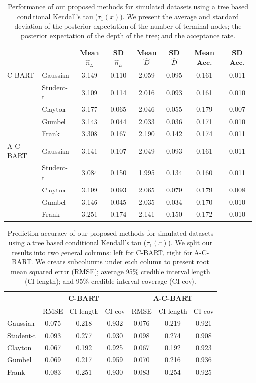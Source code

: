 \documentclass[
12pt]{article}
\begin{document}
	\begin{table}[h]
		\centering
		\begin{tabular}{l|l|cccccc}
			& & Mean $\hat{n}_L$ & SD $\hat{n}_L$ & Mean $\hat{D}$ & SD $\hat{D}$ & Mean Acc. & SD Acc. \\ 
			\hline
			C-BART & Gaussian & 3.149 & 0.110 & 2.059 & 0.095 & 0.161 & 0.011 \\ 
			& Student-t & 3.109 & 0.114 & 2.016 & 0.093 & 0.161 & 0.010 \\ 
			& Clayton & 3.177 & 0.065 & 2.046 & 0.055 & 0.179 & 0.007 \\ 
			& Gumbel & 3.143 & 0.044 & 2.033 & 0.036 & 0.171 & 0.010 \\ 
			& Frank & 3.308 & 0.167 & 2.190 & 0.142 & 0.174 & 0.011 \\
			\hline
			A-C-BART & Gaussian & 3.141 & 0.107 & 2.049 & 0.093 & 0.161 & 0.011 \\ 
			& Student-t & 3.084 & 0.150 & 1.995 & 0.134 & 0.160 & 0.011 \\ 
			& Clayton & 3.199 & 0.093 & 2.065 & 0.079 & 0.179 & 0.008 \\ 
			& Gumbel & 3.146 & 0.045 & 2.035 & 0.034 & 0.170 & 0.010 \\ 
			& Frank & 3.251 & 0.174 & 2.141 & 0.150 & 0.172 & 0.010 \\
		\end{tabular}
		\caption{Performance of our proposed methods for simulated datasets using a tree based conditional Kendall's tau ($\tau_1(x)$). We present the average and standard deviation of the posterior expectation of the number of terminal nodes; the posterior expectation of the depth of the tree; and the acceptance rate.}
		\label{tab:eff:ex1}
	\end{table}
	
	\begin{table}[ht]
		\centering
		\begin{tabular}{l|ccc|ccc}
			\multicolumn{1}{c|}{} &
			\multicolumn{3}{c|}{C-BART} &
			\multicolumn{3}{c}{A-C-BART} \\
			\hline
			& RMSE & CI-length & CI-cov & RMSE & CI-length & CI-cov \\ 
			\hline
			Gaussian & 0.075 & 0.218 & 0.932 & 0.076 & 0.219 & 0.921 \\ 
			Student-t & 0.093 & 0.277 & 0.930 & 0.098 & 0.274 & 0.908 \\ 
			Clayton & 0.067 & 0.192 & 0.925 & 0.067 & 0.192 & 0.923 \\ 
			Gumbel & 0.069 & 0.217 & 0.959 & 0.070 & 0.216 & 0.936 \\ 
			Frank & 0.083 & 0.251 & 0.930 & 0.083 & 0.254 & 0.925 
		\end{tabular}
		\caption{Prediction accuracy of our proposed methods for simulated datasets using a tree based conditional Kendall's tau ($\tau_1(x)$). We split our results into two general columns: left for C-BART, right for A-C-BART. We create subcolumns under each column to present root mean squared error (RMSE); average 95\% credible interval length (CI-length); and 95\% credible interval coverage (CI-cov).}
		\label{tab:pred:ex1}
	\end{table}
	
\end{document}

